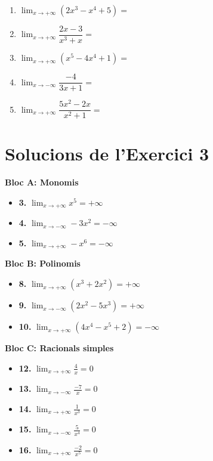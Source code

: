 \documentclass[12pt,a4paper]{article}
\begin{document}
\vspace{0.3cm}
\begin{enumerate}[label=\textbf{\arabic*.}, resume, itemsep=0.8cm]
    \item $\lim_{x \to +\infty} (2x^3 - x^4 + 5) = $
    \item $\lim_{x \to +\infty} \dfrac{2x - 3}{x^3 + x} = $
    \item $\lim_{x \to +\infty} (x^5 - 4x^4 + 1) = $
    \item $\lim_{x \to -\infty} \dfrac{-4}{3x + 1} = $
    \item $\lim_{x \to +\infty} \dfrac{5x^2 - 2x}{x^2 + 1} = $
\end{enumerate}

\newpage
\section*{Solucions de l'Exercici 3}

\textbf{Bloc A: Monomis}
\begin{itemize}
    \item \textbf{3.} $\lim_{x \to +\infty} x^5 = +\infty$
    \item \textbf{4.} $\lim_{x \to -\infty} -3x^2 = -\infty$
    \item \textbf{5.} $\lim_{x \to +\infty} -x^6 = -\infty$
\end{itemize}

\textbf{Bloc B: Polinomis}
\begin{itemize}
    \item \textbf{8.} $\lim_{x \to +\infty} (x^3 + 2x^2) = +\infty$
    \item \textbf{9.} $\lim_{x \to -\infty} (2x^2 - 5x^3) = +\infty$
    \item \textbf{10.} $\lim_{x \to +\infty} (4x^4 - x^5 + 2) = -\infty$
\end{itemize}

\textbf{Bloc C: Racionals simples}
\begin{itemize}
    \item \textbf{12.} $\lim_{x \to +\infty} \frac{4}{x} = 0$
    \item \textbf{13.} $\lim_{x \to -\infty} \frac{-7}{x} = 0$
    \item \textbf{14.} $\lim_{x \to +\infty} \frac{1}{x^3} = 0$
    \item \textbf{15.} $\lim_{x \to -\infty} \frac{5}{x^4} = 0$
    \item \textbf{16.} $\lim_{x \to +\infty} \frac{-2}{x^5} = 0$
\end{itemize}
\end{document}

